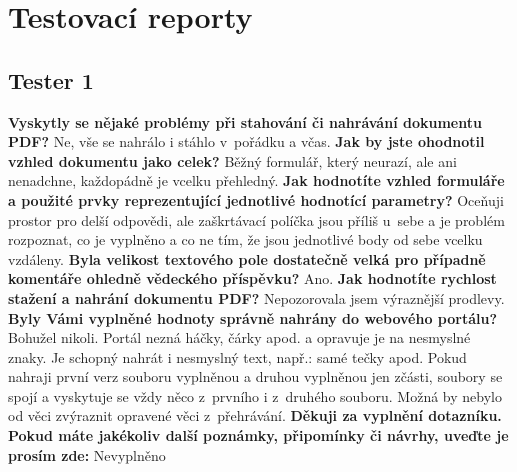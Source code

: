 \chapter{Testovací reporty}
\label{chap:testovaci_reporty}

\section{Tester 1}

\textbf{Vyskytly se nějaké problémy při stahování či nahrávání dokumentu PDF?}
\newline
Ne, vše se nahrálo i stáhlo v~pořádku a včas.
\newline
\newline
\textbf{Jak by jste ohodnotil vzhled dokumentu jako celek?}
\newline
Běžný formulář, který neurazí, ale ani nenadchne, každopádně je vcelku přehledný.
\newline
\newline
\textbf{Jak hodnotíte vzhled formuláře a použité prvky reprezentující jednotlivé hodnotící parametry?}
\newline
Oceňuji prostor pro delší odpovědi, ale zaškrtávací políčka jsou příliš u~sebe a je problém rozpoznat, co je vyplněno a co ne tím, že jsou jednotlivé body od sebe vcelku vzdáleny.
\newline
\newline
\textbf{Byla velikost textového pole dostatečně velká pro případně komentáře ohledně vědeckého příspěvku?}
\newline
Ano.
\newline
\newline
\textbf{Jak hodnotíte rychlost stažení a nahrání dokumentu PDF?} 
\newline
Nepozorovala jsem výraznější prodlevy.
\newline
\newline
\textbf{Byly Vámi vyplněné hodnoty správně nahrány do webového portálu?}
\newline
Bohužel nikoli. Portál nezná háčky, čárky apod. a opravuje je na nesmyslné znaky. Je schopný nahrát i nesmyslný text, např.: samé tečky apod. Pokud nahraji první verz souboru vyplněnou a druhou vyplněnou jen zčásti, soubory se spojí a vyskytuje se vždy něco z~prvního i z~druhého souboru. Možná by nebylo od věci zvýraznit opravené věci z~přehrávání.
\newline
\newline
\textbf{Děkuji za vyplnění dotazníku. Pokud máte jakékoliv další poznámky, připomínky či návrhy, uveďte je prosím zde:}
\newline
Nevyplněno
\newpage 

